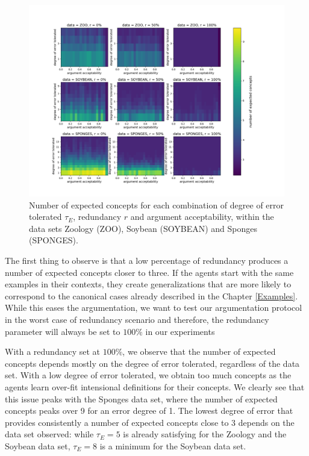 \begin{figure}[t]
    \centering
    \includegraphics[width = \textwidth]{figs/Figure_parameters.png}
    \caption{Number of expected concepts for each combination of degree of error tolerated $\tau_{E}$, redundancy $r$ and argument acceptability, within the data sets Zoology (ZOO), Soybean (SOYBEAN) and Sponges (SPONGES).}
    \label{fig:param}
\end{figure}

The first thing to observe is that a low percentage of redundancy produces a number of expected concepts closer to three. If the agents start with the same examples in their contexts, they create generalizations that are more likely to correspond to the canonical cases already described in the Chapter \ref{Examples}. While this eases the argumentation, we want to test our argumentation protocol in the worst case of redundancy scenario and therefore, the redundancy parameter will always be set to $100 \%$ in our experiments

With a redundancy set at $100 \%$, we observe that the number of expected concepts depends mostly on the degree of error tolerated, regardless of the data set. With a low degree of error tolerated, we obtain too much concepts as the agents learn over-fit intensional definitions for their concepts. We clearly see that this issue peaks with the Sponges data set, where the number of expected concepts peaks over 9 for an error degree of 1. The lowest degree of error that provides consistently a number of expected concepts close to 3 depends on the data set observed: while $\tau_{E} = 5$ is already satisfying for the Zoology and the Soybean data set, $\tau_{E} = 8$ is a minimum for the Soybean data set.

